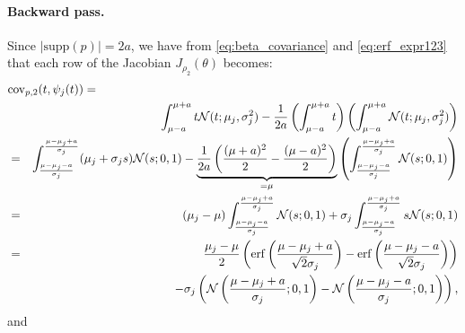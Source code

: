 \documentclass{article}
\begin{document}
\paragraph{Backward pass.}
Since $|\mathrm{supp}(p)| = 2a$, we have from \eqref{eq:beta_covariance} and \eqref{eq:erf_expr123} that each row of the Jacobian $J_{\rho_2}(\theta)$ becomes:
\begin{eqnarray}
\lefteqn{\mathrm{cov}_{p, 2}(t, \psi_j(t)) =} \nonumber\\
&& \int_{\mu-a}^{\mu+a} t\mathcal{N}(t; \mu_j, \sigma_j^2)
- \frac{1}{2a}\left(\int_{\mu-a}^{\mu+a} t\right)\left(\int_{\mu-a}^{\mu+a} \mathcal{N}(t; \mu_j, \sigma_j^2)\right)\nonumber\\
&=&
\int_{\frac{\mu-\mu_j-a}{\sigma_j}}^{\frac{\mu-\mu_j+a}{\sigma_j}} (\mu_j + \sigma_j s)\mathcal{N}(s; 0, 1)
- \underbrace{\frac{1}{2a}\left( \frac{(\mu+a)^2}{2} - \frac{(\mu-a)^2}{2} \right)}_{=\mu} 
\left( \int_{\frac{\mu-\mu_j-a}{\sigma_j}}^{\frac{\mu-\mu_j+a}{\sigma_j}} \mathcal{N}(s; 0, 1) \right)\nonumber\\
&=&
(\mu_j-\mu)\int_{\frac{\mu-\mu_j-a}{\sigma_j}}^{\frac{\mu-\mu_j+a}{\sigma_j}} \mathcal{N}(s; 0, 1)
+ \sigma_j \int_{\frac{\mu-\mu_j-a}{\sigma_j}}^{\frac{\mu-\mu_j+a}{\sigma_j}} s\mathcal{N}(s; 0, 1)
\nonumber\\
&=&
\frac{\mu_j-\mu}{2}\left( \mathrm{erf}\left( \frac{\mu-\mu_j+a}{\sqrt{2}\sigma_j} \right) - \mathrm{erf}\left( \frac{\mu-\mu_j-a}{\sqrt{2}\sigma_j} \right)\right)\nonumber\\
&& - \sigma_j \left( \mathcal{N}\left(\frac{\mu-\mu_j+a}{\sigma_j}; 0, 1\right) - \mathcal{N}\left(\frac{\mu-\mu_j-a}{\sigma_j}; 0, 1\right) \right),
\end{eqnarray}
and
\end{document}

